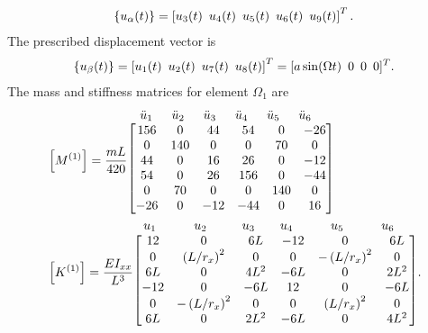 \documentclass{AeroStructure-ERJohnson}
\begin{document}
\begin{example}
\begin{align}\label{ex18.5a}
\left\{u_{\alpha}(t)\right\}=\left[u_{3}(t)\enskip u_{4}(t)\enskip u_{5}(t)\enskip u_{6}(t)\enskip u_{9}(t)\right]^{T}.
\end{align}
The prescribed displacement vector is
\begin{align}\label{ex18.5b}
\left\{u_{\beta}(t)\right\}=\left[u_{1}(t)\enskip u_{2}(t)\enskip u_{7}(t)\enskip u_{8}(t)\right]^{T}=[a \sin (\Omega t)\enskip 0\enskip 0\enskip 0]^{T}.
\end{align}
The mass and stiffness matrices for element $\Omega_1$ are
\begin{align}\label{ex18.5c}
&\left[M^{(1)}\right]=\frac{m L}{420}
\begin{array}{@{}l@{}}
{\begin{array}{@{}l@{}}
\hspace*{10pt}\ddot{u}_1 \hspace*{15pt}\ddot{u}_2 \hspace*{15pt}\ddot{u}_3 \hspace*{15pt}\ddot{u}_4 \hspace*{15pt}\ddot{u}_5 \hspace*{15pt}\ddot{u}_6
\end{array}}\\
\left[\begin{array}{@{}cccccc@{}}156 & 0 & 44 & 54 & 0 & -26 \\0 & 140 & 0 & 0 & 70 & 0 \\44 & 0 & 16 & 26 & 0 & -12 \\54 & 0 & 26 & 156 & 0 & -44 \\0 & 70 & 0 & 0 & 140 & 0 \\-26 & 0 & -12 & -44 & 0 & 16\end{array}\right]\end{array}\nonumber\\
&\left[K^{(1)}\right]=\frac{E I_{x x}}{L^{3}}
\begin{array}{@{}l@{}}
{\begin{array}{@{}l@{}}
\hspace*{8pt}u_1 \hspace*{30pt}u_2 \hspace*{28pt}u_3 \hspace*{20pt}u_4 \hspace*{30pt}u_5 \hspace*{30pt}u_6
\end{array}}\\
\left[\begin{array}{@{}cccccc@{}}12 & 0 & 6 L & -12 & 0 & 6 L \\0 & \left(L/r_{x}\right)^{2} & 0 & 0 & -\left(L/ r_{x}\right)^{2} & 0 \\6 L & 0 & 4 L^{2} & -6 L & 0 & 2 L^{2} \\-12 & 0 & -6 L & 12 & 0 & -6 L \\0 & -\left(L/ r_{x}\right)^{2} & 0 & 0 & \left(L/r_{x}\right)^{2} & 0 \\6 L & 0 & 2 L^{2} & -6 L & 0 & 4 L^{2}\end{array}\right]\end{array}.

\end{align}
\end{example}
\end{document}
